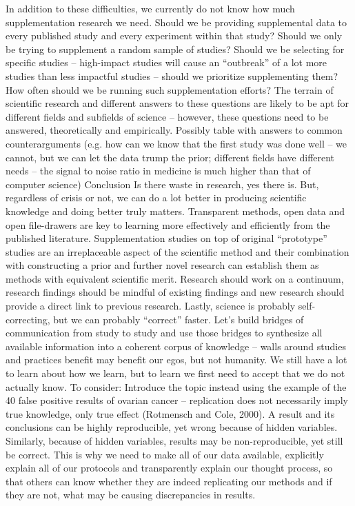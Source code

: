 \documentclass[12pt]{article}
\begin{document}
In addition to these difficulties, we currently do not know how much supplementation research we need. Should we be providing supplemental data to every published study and every experiment within that study? Should we only be trying to supplement a random sample of studies? Should we be selecting for specific studies – high-impact studies will cause an “outbreak” of a lot more studies than less impactful studies – should we prioritize supplementing them? How often should we be running such supplementation efforts? The terrain of scientific research and different answers to these questions are likely to be apt for different fields and subfields of science – however, these questions need to be answered, theoretically and empirically.
Possibly table with answers to common counterarguments (e.g. how can we know that the first study was done well – we cannot, but we can let the data trump the prior; different fields have different needs – the signal to noise ratio in medicine is much higher than that of computer science)
Conclusion
Is there waste in research, yes there is. But, regardless of crisis or not, we can do a lot better in producing scientific knowledge and doing better truly matters. Transparent methods, open data and open file-drawers are key to learning more effectively and efficiently from the published literature. Supplementation studies on top of original “prototype” studies are an irreplaceable aspect of the scientific method and their combination with constructing a prior and further novel research can establish them as methods with equivalent scientific merit. Research should work on a continuum, research findings should be mindful of existing findings and new research should provide a direct link to previous research. Lastly, science is probably self-correcting, but we can probably “correct” faster. Let’s build bridges of communication from study to study and use those bridges to synthesize all available information into a coherent corpus of knowledge – walls around studies and practices benefit may benefit our egos, but not humanity. We still have a lot to learn about how we learn, but to learn we first need to accept that we do not actually know. 
To consider: Introduce the topic instead using the example of the 40 false positive results of ovarian cancer – replication does not necessarily imply true knowledge, only true effect (Rotmensch and Cole, 2000). A result and its conclusions can be highly reproducible, yet wrong because of hidden variables. Similarly, because of hidden variables, results may be non-reproducible, yet still be correct. This is why we need to make all of our data available, explicitly explain all of our protocols and transparently explain our thought process, so that others can know whether they are indeed replicating our methods and if they are not, what may be causing discrepancies in results.  
 
\end{document}
